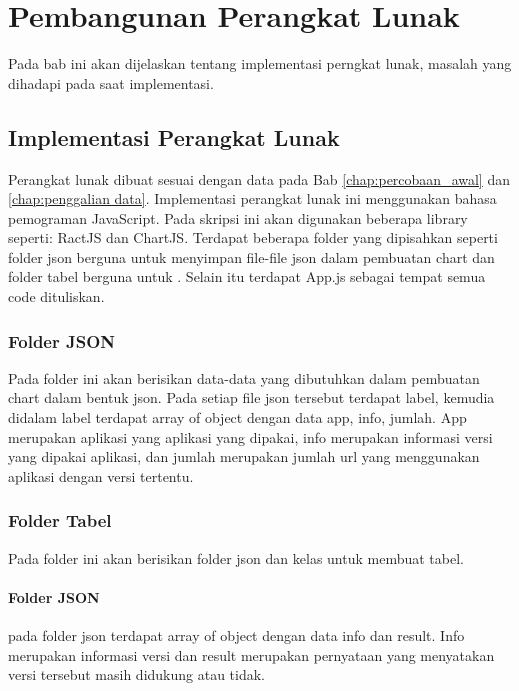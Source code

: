 \chapter{Pembangunan Perangkat Lunak}
\label{chap:pembangunan PL}
Pada bab ini akan dijelaskan tentang implementasi perngkat lunak, masalah yang dihadapi pada saat implementasi.
\section{Implementasi Perangkat Lunak}
Perangkat lunak dibuat sesuai dengan data pada Bab \ref{chap:percobaan_awal} dan \ref{chap:penggalian data}. Implementasi perangkat lunak ini menggunakan bahasa pemograman JavaScript. Pada skripsi ini akan digunakan beberapa library seperti: RactJS dan ChartJS. Terdapat beberapa folder yang dipisahkan seperti folder json berguna untuk menyimpan file-file json dalam pembuatan chart dan folder tabel berguna untuk . Selain itu terdapat App.js sebagai tempat semua code dituliskan.

\subsection{Folder JSON}
Pada folder ini akan berisikan data-data yang dibutuhkan dalam pembuatan chart dalam bentuk json. Pada setiap file json tersebut terdapat label, kemudia didalam label terdapat array of object dengan data app, info, jumlah. App merupakan aplikasi yang aplikasi yang dipakai, info merupakan informasi versi yang dipakai aplikasi, dan jumlah merupakan jumlah url yang menggunakan aplikasi dengan versi tertentu.

\subsection{Folder Tabel}
Pada folder ini akan berisikan folder json dan kelas untuk membuat tabel. 
\subsubsection{Folder JSON}
pada folder json terdapat array of object dengan data info dan result. Info merupakan informasi versi dan result merupakan pernyataan yang menyatakan versi tersebut masih didukung atau tidak. 
